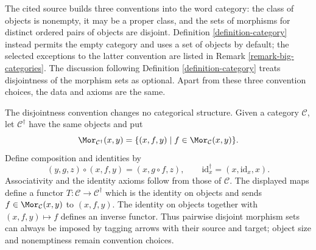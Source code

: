 \begin{remark}
\label{remark-category-convention-boundary}
\begin{reference}
\cite[Chapter I, Section 1.1, p. 122]{Tohoku}
\end{reference}
The cited source builds three conventions into the word category: the class
of objects is nonempty, it may be a proper class, and the sets of morphisms
for distinct ordered pairs of objects are disjoint. Definition
\ref{definition-category} instead permits the empty category and uses a set
of objects by default; the selected exceptions to the latter convention are
listed in Remark \ref{remark-big-categories}. The discussion following
Definition \ref{definition-category} treats disjointness of the morphism
sets as optional. Apart from these three convention choices, the data and
axioms are the same.

The disjointness convention changes no categorical structure. Given a
category $\mathcal{C}$, let $\mathcal{C}^\dagger$ have the same objects and
put
$$
\Mor_{\mathcal{C}^\dagger}(x, y) =
\{(x, f, y) \mid f \in \Mor_\mathcal{C}(x, y)\}.
$$
Define composition and identities by
$$
(y, g, z) \circ (x, f, y) = (x, g \circ f, z), \qquad
\text{id}^{\dagger}_x = (x, \text{id}_x, x).
$$
Associativity and the identity axioms follow from those of $\mathcal{C}$.
The displayed maps define a functor
$T : \mathcal{C} \to \mathcal{C}^\dagger$ which is the identity on objects
and sends $f \in \Mor_\mathcal{C}(x, y)$ to $(x, f, y)$. The identity on
objects together with $(x, f, y) \mapsto f$ defines an inverse functor.
Thus pairwise disjoint morphism sets can always be imposed by tagging arrows
with their source and target; object size and nonemptiness remain convention
choices.
\end{remark}
